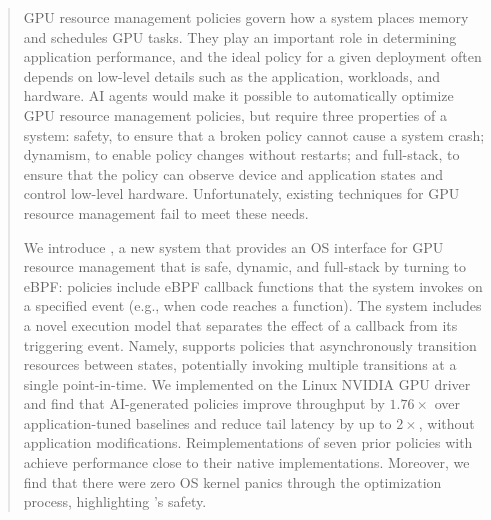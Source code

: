 \begin{abstract}
GPU resource management policies govern how a system places memory and schedules GPU tasks.
They play an important role in determining application performance, and the ideal policy for a given deployment often depends on low-level details such as the application, workloads, and hardware.
AI agents would make it possible to automatically optimize GPU resource management policies, but require three properties of a system: safety, to ensure that a broken policy cannot cause a system crash; dynamism, to enable policy changes without restarts; and full-stack, to ensure that the policy can observe device and application states and control low-level hardware.
Unfortunately, existing techniques for GPU resource management fail to meet these needs.

We introduce \sys, a new system that provides an OS interface for GPU resource management that is safe, dynamic, and full-stack by turning to eBPF: \sys{} policies include eBPF callback functions that the system invokes on a specified event (e.g., when code reaches a function).
The system includes a novel execution model that separates the effect of a callback from its triggering event.
Namely, \sys{} supports policies that asynchronously transition resources between states, potentially invoking multiple transitions at a single point-in-time.
We implemented \sys{} on the Linux NVIDIA GPU driver and find that AI-generated policies improve throughput by $1.76\times$ over application-tuned baselines and reduce tail latency by up to $2\times$, without application modifications.
Reimplementations of seven prior policies with \sys{} achieve performance close to their native implementations.
Moreover, we find that there were zero OS kernel panics through the optimization process, highlighting \sys{}'s safety.
\end{abstract}
